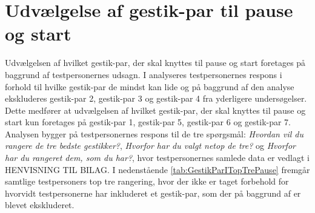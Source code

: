 \section{Udvælgelse af gestik-par til pause og start}
\label{TestresultaterPauseStart}
%
Udvælgelsen af hvilket gestik-par, der skal knyttes til pause og start foretages på baggrund af testpersonernes udsagn. I  analyseres testpersonernes respons i forhold til hvilke gestik-par de mindst kan lide og på baggrund af den analyse ekskluderes gestik-par 2, gestik-par 3 og gestik-par 4 fra yderligere undersøgelser. Dette medfører at udvælgelsen af hvilket gestik-par, der skal knyttes til pause og start kun foretages på gestik-par 1, gestik-par 5, gestik-par 6 og gestik-par 7. Analysen bygger på testpersonernes respons til de tre spørgsmål: \textit{Hvordan vil du rangere de tre bedste gestikker?}, \textit{Hvorfor har du valgt netop de tre?} og \textit{Hvorfor har du rangeret dem, som du har?}, hvor testpersonernes samlede data er vedlagt i HENVISNING TIL BILAG.  \blankline
%  
I nedenstående \autoref{tab:GestikParITopTrePause} fremgår samtlige testpersoners top tre rangering, hvor der ikke er taget forbehold for hvorvidt testpersonerne har inkluderet et gestik-par, som der på baggrund af  er blevet ekskluderet.
%
